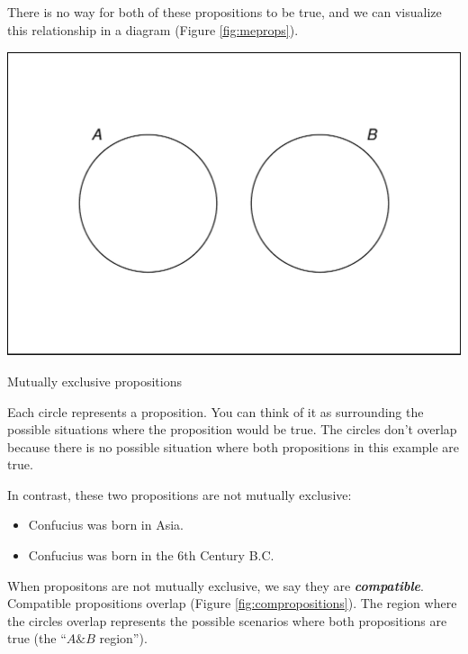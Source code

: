 \documentclass[justified]{tufte-book}
\providecommand{\tightlist}{%
  \setlength{\itemsep}{0pt}\setlength{\parskip}{0pt}}
\renewcommand{\wedge}{\mathbin{\&}}
\theoremstyle{definition}
\theoremstyle{definition}
\theoremstyle{definition}
\theoremstyle{definition}
\theoremstyle{remark}
\begin{document}
There is no way for both of these propositions to be true, and we can visualize this relationship in a diagram (Figure \ref{fig:meprops}).

\begin{marginfigure}
\includegraphics{_main_files/figure-latex/meprops-1} \caption[Mutually exclusive propositions]{Mutually exclusive propositions}\label{fig:meprops}
\end{marginfigure}

Each circle represents a proposition. You can think of it as surrounding the possible situations where the proposition would be true. The circles don't overlap because there is no possible situation where both propositions in this example are true.

In contrast, these two propositions are not mutually exclusive:

\begin{itemize}
\tightlist
\item
  Confucius was born in Asia.
\item
  Confucius was born in the 6th Century B.C.
\end{itemize}

When propositons are not mutually exclusive, we say they are \textbf{\emph{compatible}}. Compatible propositions overlap (Figure \ref{fig:compropositions}). The region where the circles overlap represents the possible scenarios where both propositions are true (the ``\(A \wedge B\) region'').
\end{document}
